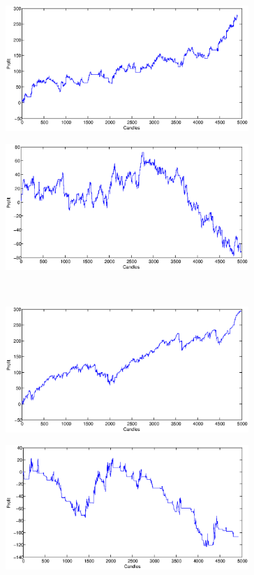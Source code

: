 \documentclass{tewiart}
\begin{document}
\begin{figure}[h]
\centering
\begin{minipage}{.49\linewidth}
\centering 
\includegraphics[width=0.82\textwidth]{images/S1a_fus.eps}
\label{jedno}
\end{minipage}
\begin{minipage}{.49\linewidth}
\centering 
\includegraphics[width=0.82\textwidth]{images/S1b_fus.eps}
\label{dwu}
\end{minipage}
\\
\begin{minipage}{.49\linewidth}
\centering 
\includegraphics[width=0.82\textwidth]{images/S1c_fus.eps}
\label{cztero}
\end{minipage}
\begin{minipage}{.49\linewidth}
\centering 
\includegraphics[width=0.82\textwidth]{images/S1d_fus.eps}

\end{minipage}
\end{figure}
\end{document}
